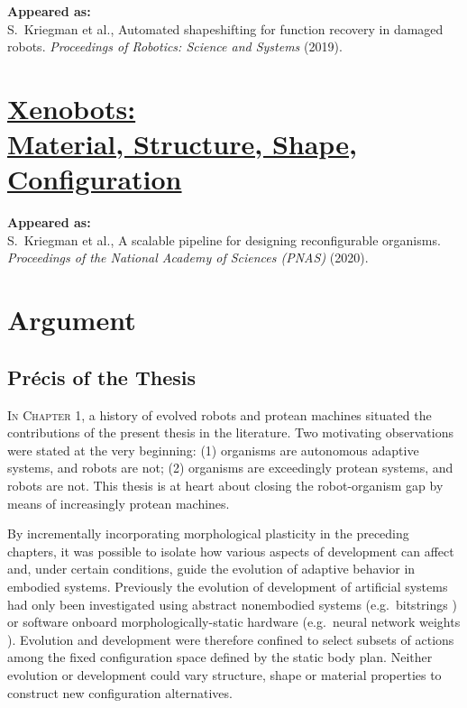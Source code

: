 \textbf{Appeared as:}\\
S.~Kriegman et al., Automated shapeshifting for function recovery in damaged robots. \textit{Proceedings of Robotics: Science and Systems} (2019).


\chapter[Xenobots: Material, Structure, Shape, Configuration]{\href{https://www.pnas.org/content/117/4/1853}{\color{blue}Xenobots: \\ {\LARGE Material, Structure, Shape, Configuration}}}

\textbf{Appeared as:}\\
S.~Kriegman et al., A scalable pipeline for designing reconfigurable organisms. 
\textit{Proceedings of the National Academy of Sciences (PNAS)} (2020).





\chapter{Argument}


\section{Pr\'{e}cis of the Thesis}

\textsc{In Chapter 1,}
a history of 
evolved robots 
and protean machines 
situated the contributions of the present thesis in the literature.
Two motivating observations were stated at the very beginning:
(1) organisms are autonomous adaptive systems, and robots are not;
(2) organisms are exceedingly protean systems, and robots are not.
This thesis is at heart about closing the robot-organism gap by means of increasingly protean machines.


By incrementally incorporating morphological plasticity in the preceding chapters, it was possible to isolate how various aspects of development can affect and, under certain conditions, guide the evolution of adaptive behavior in embodied systems.
Previously the evolution of development of artificial systems had only been investigated using abstract nonembodied systems (e.g.~bitstrings \cite{hinton1987learning})
or software onboard morphologically-static hardware
(e.g.~neural network weights \cite{husbands1998better,floreano1996plastic}).
Evolution and development were therefore confined to select subsets of actions among the fixed configuration space defined by the static body plan.
Neither evolution or development could vary structure, shape or material properties to construct new configuration alternatives.

